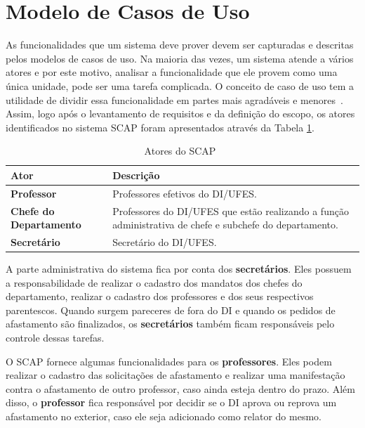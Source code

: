 \section{Modelo de Casos de Uso}
\label{sec-requisitos-modelo-casos-uso}

As funcionalidades que um sistema deve prover devem ser capturadas e descritas pelos modelos de casos de uso. Na maioria das vezes, um sistema atende a vários atores e por este motivo, analisar a funcionalidade que ele provem como uma única unidade, pode ser uma tarefa complicada. O conceito de caso de uso tem a utilidade de dividir essa funcionalidade em partes mais agradáveis e menores~\cite{olive:cmis07}. Assim, logo após o levantamento de requisitos e da definição do escopo, os atores identificados no sistema SCAP foram apresentados através da Tabela \ref{tabela-atores-scap}.  

\begin{table}[h]
	\centering	
	\vspace{0.5cm}
	\footnotesize
	\caption{Atores do SCAP~\cite{duarte-pg14}}	
	\label{tabela-atores-scap}
	\begin{tabular}{|p{5.0cm}|p{9.0cm}|}  \hline 
 		
 		\rowcolor[rgb]{0.8,0.8,0.8} \textbf{Ator} & \textbf{Descrição} \\\hline 
		
		\textbf{Professor} & Professores efetivos do DI/UFES. \\\hline
		
		\textbf{Chefe do Departamento} & Professores do DI/UFES que estão realizando a função administrativa de chefe e subchefe do departamento. \\\hline
		
		\textbf{Secretário} & Secretário do DI/UFES. \\\hline
		
	\end{tabular}
\end{table}

A parte administrativa do sistema fica por conta dos \textbf{secretários}. Eles possuem a responsabilidade de realizar o cadastro dos mandatos dos chefes do departamento, realizar o cadastro dos professores e dos seus respectivos parentescos. Quando surgem pareceres de fora do DI e quando os pedidos de afastamento são finalizados, os \textbf{secretários} também ficam responsáveis pelo controle dessas tarefas.

O SCAP fornece algumas funcionalidades para os \textbf{professores}. Eles podem realizar o cadastro das solicitações de afastamento e realizar uma manifestação contra o afastamento de outro professor, caso ainda esteja dentro do prazo. Além disso, o \textbf{professor} fica responsável por decidir se o DI aprova ou reprova um afastamento no exterior, caso ele seja adicionado como relator do mesmo. 

